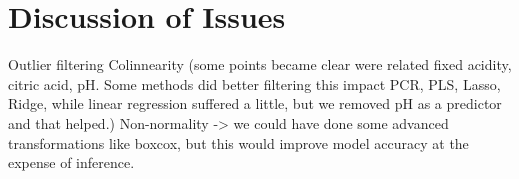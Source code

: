 \documentclass[]{article}
\begin{document}
\section{Discussion of Issues}\label{discussion-of-issues}

Outlier filtering Colinnearity (some points became clear were related
fixed acidity, citric acid, pH. Some methods did better filtering this
impact PCR, PLS, Lasso, Ridge, while linear regression suffered a
little, but we removed pH as a predictor and that helped.) Non-normality
-\textgreater{} we could have done some advanced transformations like
boxcox, but this would improve model accuracy at the expense of
inference.
\end{document}
